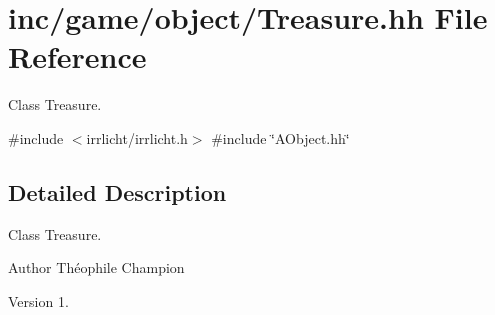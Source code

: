 \hypertarget{Treasure_8hh}{}\section{inc/game/object/\+Treasure.hh File Reference}
\label{Treasure_8hh}


Class Treasure.  


{\ttfamily \#include $<$irrlicht/irrlicht.\+h$>$}\newline
{\ttfamily \#include \char`\"{}A\+Object.\+hh\char`\"{}}\newline


\subsection{Detailed Description}
Class Treasure. 

\begin{DoxyAuthor}{Author}
Théophile Champion 
\end{DoxyAuthor}
\begin{DoxyVersion}{Version}
1. 
\end{DoxyVersion}
